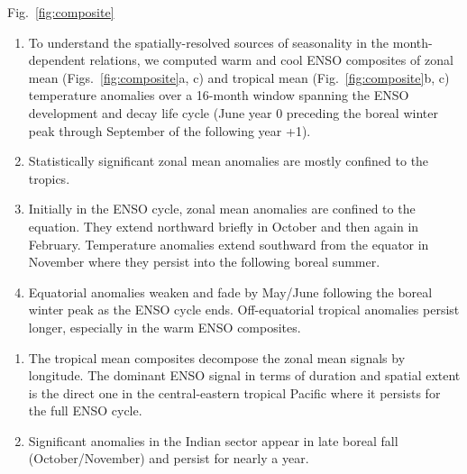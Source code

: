 \documentclass[aspectratio=169,xcolor=dvipsnames]{beamer}
\begin{document}
\begin{frame}{Fig.\ \ref{fig:composite}}
  \begin{enumerate}\tiny
  \item To understand the spatially-resolved sources of seasonality in
    the month-dependent relations, we computed warm and cool ENSO
    composites of zonal mean (Figs.\ \ref{fig:composite}a, c) and
    tropical mean (Fig.\ \ref{fig:composite}b, c) temperature
    anomalies over a 16-month window spanning the ENSO development and
    decay life cycle (June year 0 preceding the boreal winter peak
    through September of the following year +1).
  \item Statistically significant zonal mean anomalies are mostly
    confined to the tropics.
  \item Initially in the ENSO cycle, zonal mean anomalies are confined
    to the equation. They extend northward briefly in October and then
    again in February. Temperature anomalies extend southward from the
    equator in November where they persist into the following boreal
    summer.
  \item Equatorial anomalies weaken and fade by May/June following the
    boreal winter peak as the ENSO cycle ends. Off-equatorial tropical
    anomalies persist longer, especially in the warm ENSO composites.
  \end{enumerate}
  \begin{enumerate}\tiny
  \item The tropical mean composites decompose the zonal mean signals
    by longitude. The dominant ENSO signal in terms of duration and
    spatial extent is the direct one in the central-eastern tropical
    Pacific where it persists for the full ENSO cycle.
    
  \item Significant anomalies in the Indian sector appear in late
    boreal fall (October/November) and persist for nearly a year.
    

\end{enumerate}
\end{frame}
\end{document}
